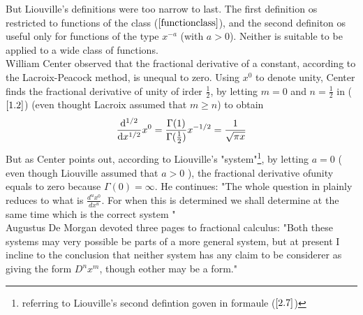 \documentclass[twoside]{book}
\begin{document}
{But Liouville's definitions were too narrow to last. The first definition os restricted to functions of the class ($\ref{functionclass}$), and the second definiton os useful only for functions of the type $x^{-a}$ (with $a>0$). Neither is suitable to be applied to a wide class of functions.\\
\newline
William Center observed that the fractional derivative of a constant, according to the Lacroix-Peacock method, is unequal to zero. Using $x^0$ to denote unity, Center finds the fractional derivative of unity of irder $\frac{1}{2}$, by letting $m=0$ and $n=\frac{1}{2}$ in ($\ref{1.2}$) (even thought Lacroix assumed that $m \geq n$) to obtain
\begin{equation}
    \label{3.1}
    \dv[1/2]{}{x}x^0 = \frac{\Gamma{(1)}}{\Gamma{(\frac{1}{2})}} x^{-1/2} = \frac{1}{\sqrt{\pi x}}
\end{equation}
But as Center points out, according to Liouville's "system"\footnote{referring to Liouville's second defintion goven in formaule ($\ref{2.7}$)}, by letting $a=0$ ( even though Liouville assumed that $a>0$ ), the fractional derivative ofunity equals to zero because $\Gamma{(0)} = \infty $. He continues: "The whole question in plainly reduces to what is $\frac{d^u x^0}{dx^u} $. For when this is determined we shall determine at the same time which is the correct system "\\
Augustus De Morgan devoted three pages to fractional calculus: "Both these systems may very possible be parts of a more general system, but at present I incline to the conclusion that neither system has any claim to be considerer as giving the form $D^n x^m$, though eother may be a form."\\

}
\end{document}
